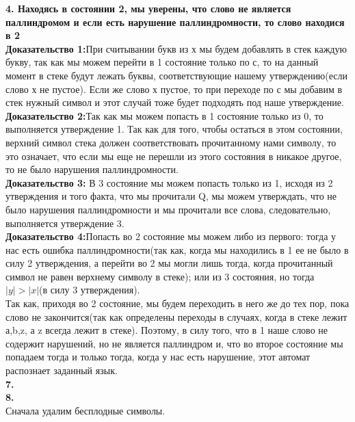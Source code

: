 \documentclass[a4paper,12pt]{article}
\begin{document}
\textbf{4. Находясь в состоянии 2, мы уверены, что слово не является паллиндромом и если есть нарушение паллиндромности, то слово находися в 2}\\
\textbf{Доказательство 1:}При считывании букв из х мы будем добавлять в стек каждую букву, так как мы можем перейти в 1 состояние только по с, то на данный момент в стеке будут лежать буквы, соответствующие нашему утверждению(если слово х не пустое). Если же слово х пустое, то при переходе по с мы добавим в стек нужный символ и этот случай тоже будет подходять под наше утверждение.\\
\textbf{Доказательство 2:}Так как мы можем попасть в 1 состояние только из 0, то выполняется утверждение 1. Так как для того, чтобы остаться в этом состоянии, верхний символ стека должен соответствовать прочитанному нами символу, то это означает, что если мы еще не перешли из этого состояния в никакое другое, то не было нарушения паллиндромности.\\
\textbf{Доказательство 3:} В 3 состояние мы можем попасть только из 1, исходя из 2 утверждения и того факта, что мы прочитали Q, мы можем утверждать, что не было нарушения паллиндромности и мы прочитали все слова, следовательно, выполняется утверждение 3.\\
\textbf{Доказательство 4:}Попасть во 2 состояние мы можем либо из первого: тогда у нас есть ошибка паллиндромности(так как, когда мы находились в 1 ее не было в силу 2 утверждения, а перейти во 2 мы могли лишь тогда, когда прочитанный символ не равен верхнему символу в стеке); или из 3 состояния, но тогда $|y|>|x|$(в силу 3 утверждения).\\
Так как, приходя во 2 состояние, мы будем переходить в него же до тех пор, пока слово не закончится(так как определены переходы в случаях, когда в стеке лежит а,b,z, а z всегда лежит в стеке). Поэтому, в силу того, что в 1 наше слово не содержит нарушений, но не является паллиндром и, что во второе состояние мы попадаем тогда и только тогда, когда у нас есть нарушение, этот автомат распознает заданный язык.\\
\textbf{7.}\\
\textbf{8.}\\
Сначала удалим бесплодные символы.\\
\end{document}
